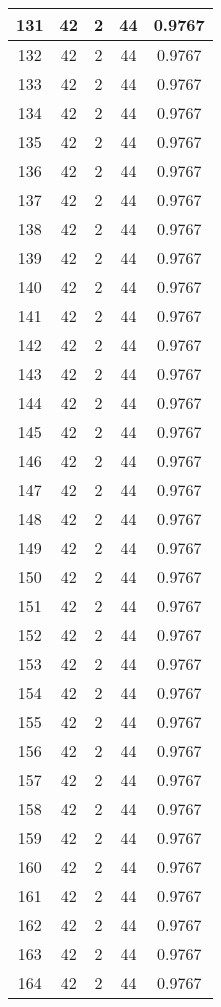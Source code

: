\documentclass[letterpaper, 12pt]{article}
\begin{document}
\begin{longtable}{|c|c|c|c|c|}
\hline
131 & 42 & 2 & 44 & 0.9767 \\
\hline
132 & 42 & 2 & 44 & 0.9767 \\
\hline
133 & 42 & 2 & 44 & 0.9767 \\
\hline
134 & 42 & 2 & 44 & 0.9767 \\
\hline
135 & 42 & 2 & 44 & 0.9767 \\
\hline
136 & 42 & 2 & 44 & 0.9767 \\
\hline
137 & 42 & 2 & 44 & 0.9767 \\
\hline
138 & 42 & 2 & 44 & 0.9767 \\
\hline
139 & 42 & 2 & 44 & 0.9767 \\
\hline
140 & 42 & 2 & 44 & 0.9767 \\
\hline
141 & 42 & 2 & 44 & 0.9767 \\
\hline
142 & 42 & 2 & 44 & 0.9767 \\
\hline
143 & 42 & 2 & 44 & 0.9767 \\
\hline
144 & 42 & 2 & 44 & 0.9767 \\
\hline
145 & 42 & 2 & 44 & 0.9767 \\
\hline
146 & 42 & 2 & 44 & 0.9767 \\
\hline
147 & 42 & 2 & 44 & 0.9767 \\
\hline
148 & 42 & 2 & 44 & 0.9767 \\
\hline
149 & 42 & 2 & 44 & 0.9767 \\
\hline
150 & 42 & 2 & 44 & 0.9767 \\
\hline
151 & 42 & 2 & 44 & 0.9767 \\
\hline
152 & 42 & 2 & 44 & 0.9767 \\
\hline
153 & 42 & 2 & 44 & 0.9767 \\
\hline
154 & 42 & 2 & 44 & 0.9767 \\
\hline
155 & 42 & 2 & 44 & 0.9767 \\
\hline
156 & 42 & 2 & 44 & 0.9767 \\
\hline
157 & 42 & 2 & 44 & 0.9767 \\
\hline
158 & 42 & 2 & 44 & 0.9767 \\
\hline
159 & 42 & 2 & 44 & 0.9767 \\
\hline
160 & 42 & 2 & 44 & 0.9767 \\
\hline
161 & 42 & 2 & 44 & 0.9767 \\
\hline
162 & 42 & 2 & 44 & 0.9767 \\
\hline
163 & 42 & 2 & 44 & 0.9767 \\
\hline
164 & 42 & 2 & 44 & 0.9767 \\

\end{longtable}
\end{document}
